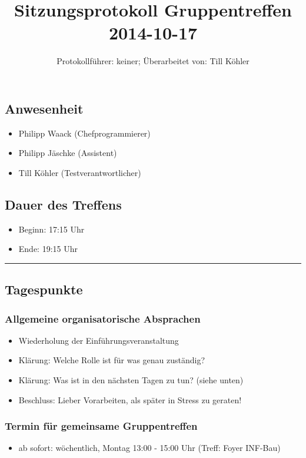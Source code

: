 \documentclass[12pt,a4paper]{article}
\author{Protokollführer: keiner; Überarbeitet von: Till Köhler}
\title{Sitzungsprotokoll Gruppentreffen 2014-10-17}
\date{}
\begin{document}
\maketitle

\subsection*{Anwesenheit}
\medskip
\begin{itemize}
\item Philipp Waack (Chefprogrammierer)
\item Philipp Jäschke (Assistent)
\item Till Köhler (Testverantwortlicher)
\end{itemize}

\subsection*{Dauer des Treffens}
\medskip
\begin{itemize}
\item Beginn: 17:15 Uhr
\item Ende: 19:15 Uhr
\end{itemize}

\noindent\rule{\textwidth}{1pt}

\subsection*{Tagespunkte}
\medskip

\subsubsection*{Allgemeine organisatorische Absprachen}
\begin{itemize}
\item Wiederholung der Einführungsveranstaltung
\item Klärung: Welche Rolle ist für was genau zuständig?
\item Klärung: Was ist in den nächsten Tagen zu tun? (siehe unten)
\item Beschluss: Lieber Vorarbeiten, als später in Stress zu geraten!
\end{itemize}

\subsubsection*{Termin für gemeinsame Gruppentreffen}
\begin{itemize}
\item ab sofort: wöchentlich, Montag 13:00 - 15:00 Uhr (Treff: Foyer INF-Bau)
\end{itemize}
\end{document}
